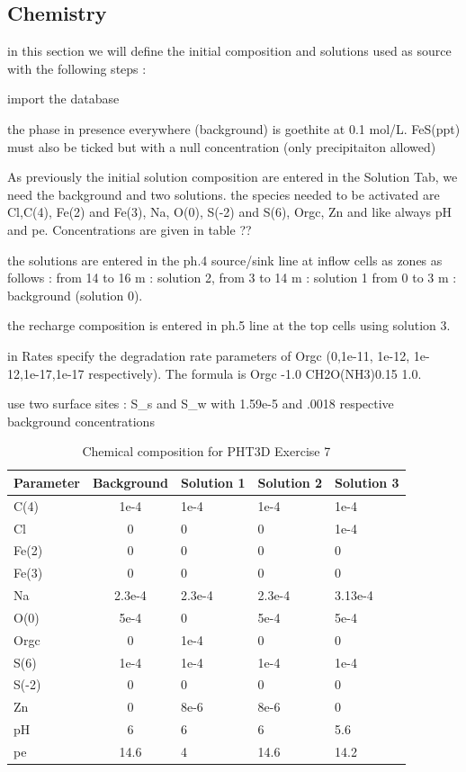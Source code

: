 \subsection{Chemistry}

in this section we will define the initial composition and solutions used as source with the following steps :
\item import the database
\item the phase in presence everywhere (background) is goethite at 0.1 mol/L. FeS(ppt) must also be ticked but with a null 
concentration (only precipitaiton allowed)
\item As previously the initial solution composition are entered in the Solution Tab, we need the background and two solutions.
the species needed to be activated are Cl,C(4), Fe(2) and Fe(3), Na, O(0), S(-2) and S(6), Orgc, Zn and like always pH and pe. 
Concentrations are given in table ??
\item the solutions are entered in the ph.4 source/sink line at inflow cells as zones as follows :
 from 14 to 16 m : solution 2, from 3 to 14 m : solution 1
from 0 to 3 m : background (solution 0).
\item the recharge composition is entered in ph.5 line at the top cells using solution 3.
\item in Rates specify the degradation rate parameters of Orgc (0,1e-11, 1e-12, 1e-12,1e-17,1e-17 respectively). 
The formula is Orgc -1.0 CH2O(NH3)0.15 1.0.
\item use two surface sites : S_s and S_w with 1.59e-5 and .0018 respective background concentrations

\begin{table}[hb]
\caption{Chemical composition for PHT3D Exercise 7}
\begin{center}
\begin{tabular}{lc} 
\toprule
Parameter  & Background & Solution 1 & Solution 2 & Solution 3\\
\midrule
C(4)      &   1e-4 &   1e-4  &   1e-4 &   1e-4\\
Cl      &   0 &   0  &  0  &   1e-4 \\
Fe(2)      &   0 &   0  &  0  &   0 \\
Fe(3)      &   0 &   0  &  0  &   0 \\
Na      &   2.3e-4 &   2.3e-4 &   2.3e-4 &   3.13e-4 \\
O(0)      &   5e-4 &   0 &   5e-4 &   5e-4\\
Orgc      &   0 &   1e-4 &   0  &  0 \\
S(6)      &   1e-4 &   1e-4  &   1e-4 &   1e-4\\
S(-2)      &   0 &   0  &  0  &   0 \\
Zn      &   0 &   8e-6  &  8e-6  &   0 \\
pH      &   6 &   6 &  6  &   5.6 \\
pe      &   14.6 &   4 &  14.6  &   14.2 \\
\bottomrule

\end{tabular}
\label{spec_table}
\end{center}
\end{table}

